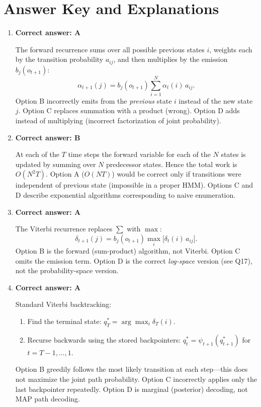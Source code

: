 \documentclass[12pt]{article}
\begin{document}
\newpage

\section{Answer Key and Explanations}

\begin{enumerate}[label=\textbf{Q\arabic*.}, leftmargin=*, itemsep=1.5em]

\item \textbf{Correct answer: A}

The forward recurrence sums over all possible previous states $i$, weights
each by the transition probability $a_{ij}$, and then multiplies by the emission
$b_j(o_{t+1})$:
\[
    \alpha_{t+1}(j)
    = b_j(o_{t+1})\sum_{i=1}^{N} \alpha_t(i)\, a_{ij}.
\]
Option B incorrectly emits from the \emph{previous} state $i$ instead of the new
state $j$.  Option C replaces summation with a product (wrong).
Option D adds instead of multiplying (incorrect factorization of joint probability).

\item \textbf{Correct answer: B}

At each of the $T$ time steps the forward variable for each of the $N$ states
is updated by summing over $N$ predecessor states.  Hence the total work is
$O(N^2 T)$.  Option A ($O(NT)$) would be correct only if transitions were
independent of previous state (impossible in a proper HMM).  Options C and D
describe exponential algorithms corresponding to naive enumeration.

\item \textbf{Correct answer: A}

The Viterbi recurrence replaces $\sum$ with $\max$:
\[
    \delta_{t+1}(j)
    = b_j(o_{t+1})\max_{i}\bigl[\delta_t(i)\, a_{ij}\bigr].
\]
Option B is the forward (sum-product) algorithm, not Viterbi.
Option C omits the emission term.
Option D is the correct \emph{log-space} version (see Q17), not the probability-space version.

\item \textbf{Correct answer: A}

Standard Viterbi backtracking:
\begin{enumerate}
    \item Find the terminal state: $q_T^* = \arg\max_i \delta_T(i)$.
    \item Recurse backwards using the stored backpointers:
          $q_t^* = \psi_{t+1}(q_{t+1}^*)$ for $t = T-1, \dots, 1$.
\end{enumerate}
Option B greedily follows the most likely transition at each step---this does not
maximize the joint path probability.
Option C incorrectly applies only the last backpointer repeatedly.
Option D is marginal (posterior) decoding, not MAP path decoding.


\end{enumerate}
\end{document}
